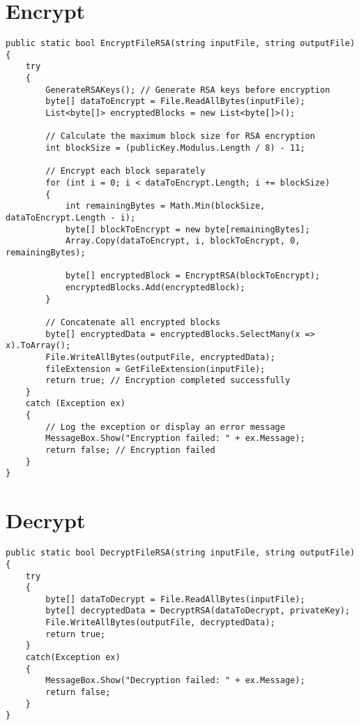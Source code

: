 \documentclass[a4paper,oneside,11pt]{book}
\begin{document}
\section{Encrypt}
\begin{lstlisting}[language=Csh, caption={Endpoint to delete FITS file}]
public static bool EncryptFileRSA(string inputFile, string outputFile)
{
    try
    {
        GenerateRSAKeys(); // Generate RSA keys before encryption
        byte[] dataToEncrypt = File.ReadAllBytes(inputFile);
        List<byte[]> encryptedBlocks = new List<byte[]>();
    
        // Calculate the maximum block size for RSA encryption
        int blockSize = (publicKey.Modulus.Length / 8) - 11; 
    
        // Encrypt each block separately
        for (int i = 0; i < dataToEncrypt.Length; i += blockSize)
        {
            int remainingBytes = Math.Min(blockSize, dataToEncrypt.Length - i);
            byte[] blockToEncrypt = new byte[remainingBytes];
            Array.Copy(dataToEncrypt, i, blockToEncrypt, 0, remainingBytes);
    
            byte[] encryptedBlock = EncryptRSA(blockToEncrypt);
            encryptedBlocks.Add(encryptedBlock);
        }
    
        // Concatenate all encrypted blocks
        byte[] encryptedData = encryptedBlocks.SelectMany(x => x).ToArray();
        File.WriteAllBytes(outputFile, encryptedData);
        fileExtension = GetFileExtension(inputFile);
        return true; // Encryption completed successfully
    }
    catch (Exception ex)
    {
        // Log the exception or display an error message
        MessageBox.Show("Encryption failed: " + ex.Message);
        return false; // Encryption failed
    }
}
\end{lstlisting}
\section{Decrypt}
\begin{lstlisting}[language=Csh, caption={Endpoint to delete FITS file}]
public static bool DecryptFileRSA(string inputFile, string outputFile)
{
    try
    {
        byte[] dataToDecrypt = File.ReadAllBytes(inputFile);
        byte[] decryptedData = DecryptRSA(dataToDecrypt, privateKey);
        File.WriteAllBytes(outputFile, decryptedData);
        return true;
    }
    catch(Exception ex)
    {
        MessageBox.Show("Decryption failed: " + ex.Message);
        return false;      
    }
}
\end{lstlisting}
\end{document}
